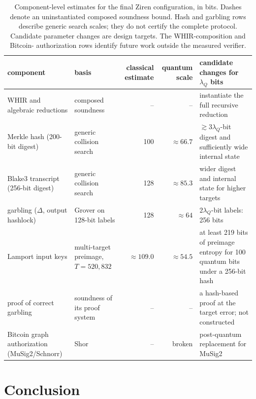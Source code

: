 \documentclass[11pt]{article}
\begin{document}
\begin{table}[t]\centering\footnotesize\setlength{\tabcolsep}{4pt}
\begin{tabularx}{\textwidth}{>{\raggedright\arraybackslash}p{2.6cm}>{\raggedright\arraybackslash}p{2.4cm}rr>{\raggedright\arraybackslash}X}\toprule
component & basis & classical estimate & quantum scale & candidate changes for $\lambda_Q$ bits\\\midrule
WHIR and algebraic reductions & composed soundness & -- & -- & instantiate the full recursive reduction\\
Merkle hash (200-bit digest) & generic collision search & 100 & $\approx66.7$ & $\gtrsim3\lambda_Q$-bit digest and sufficiently wide internal state\\
Blake3 transcript (256-bit digest) & generic collision search & 128 & $\approx85.3$ & wider digest and internal state for higher targets\\
garbling ($\Delta$, output hashlock) & Grover on 128-bit labels & 128 & $\approx64$ & $2\lambda_Q$-bit labels: 256 bits\\
Lamport input keys & multi-target preimage, $T=520{,}832$ & $\approx109.0$ & $\approx54.5$ & at least 219 bits of preimage entropy for 100 quantum bits under a 256-bit hash\\
proof of correct garbling & soundness of its proof system & -- & -- & a hash-based proof at the target error; not constructed\\
Bitcoin graph authorization (MuSig2/Schnorr) & Shor & -- & broken & post-quantum replacement for MuSig2\\\bottomrule
\end{tabularx}
\caption{Component-level estimates for the final Ziren configuration, in
bits. Dashes denote an uninstantiated composed soundness bound. Hash and
garbling rows describe generic search scales; they do not certify the
complete protocol. Candidate parameter changes are design targets. The WHIR-composition and Bitcoin-
authorization rows identify future work outside the measured verifier.}

\label{tab:pq}
\end{table}

\section{Conclusion}\label{sec:conclusion}
\end{document}
